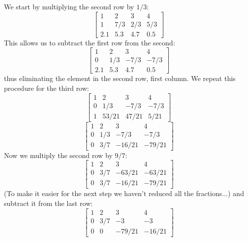 \documentclass{article}
\begin{document}
We start by multiplying the second row by $1/3$:
\begin{equation}
	\left [ \begin{array}{ccc|c}
			1 & 2 & 3 & 4 \\
			1 & 7/3 & 2/3 & 5/3 \\
			2.1 & 5.3 & 4.7 & 0.5
	\end{array} \right ]
\end{equation}
This allows us to subtract the first row from the second:
\begin{equation}
	\left [ \begin{array}{ccc|c}
			1 & 2 & 3 & 4 \\
			0 & 1/3 & -7/3 & -7/3 \\
			2.1 & 5.3 & 4.7 & 0.5
	\end{array} \right ]
\end{equation}
thus eliminating the element in the second row, first column.
We repeat this procedure for the third row:
\begin{equation}
	\left [ \begin{array}{ccc|c}
			1 & 2 & 3 & 4 \\
			0 & 1/3 & -7/3 & -7/3 \\
			1 & 53/21 & 47/21 & 5/21
	\end{array} \right ]
\end{equation}
\begin{equation}
	\left [ \begin{array}{ccc|c}
			1 & 2 & 3 & 4 \\
			0 & 1/3 & -7/3 & -7/3 \\
			0 & 3/7 & -16/21 & -79/21
	\end{array} \right ]
\end{equation}
Now we multiply the second row by $9/7$:
\begin{equation}
	\left [ \begin{array}{ccc|c}
			1 & 2 & 3 & 4 \\
			0 & 3/7 & -63/21 & -63/21 \\
			0 & 3/7 & -16/21 & -79/21
	\end{array} \right ]
\end{equation}
(To make it easier for the next step we haven't reduced all the fractions...)
and subtract it from the last row:
\begin{equation}
	\left [ \begin{array}{ccc|c}
			1 & 2 & 3 & 4 \\
			0 & 3/7 & -3 & -3 \\
			0 & 0 & -79/21 & -16/21
	\end{array} \right ]
\end{equation}
\end{document}
